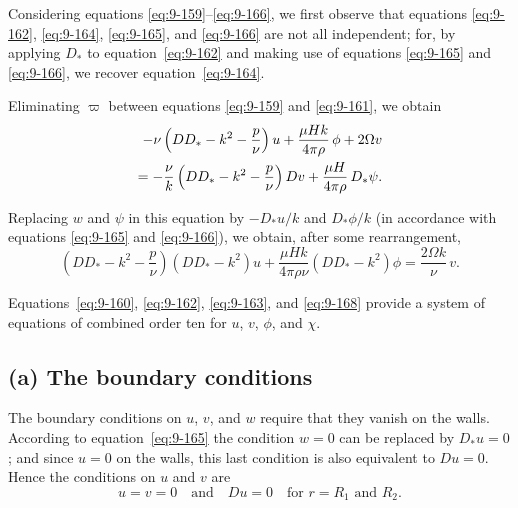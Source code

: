Considering equations \eqref{eq:9-159}--\eqref{eq:9-166}, we first observe that equations \eqref{eq:9-162}, \eqref{eq:9-164}, \eqref{eq:9-165}, and \eqref{eq:9-166} are not all independent; for, by applying $D_*$ to equation~\eqref{eq:9-162} and making use of equations \eqref{eq:9-165} and \eqref{eq:9-166}, we recover equation~\eqref{eq:9-164}.

Eliminating $\varpi$ between equations \eqref{eq:9-159} and \eqref{eq:9-161}, we obtain
\begin{align}
-\nu\left(DD_* - k^2 - \frac{p}{\nu}\right) u + \frac{\mu Hk}{4\pi\rho}\, \phi + 2\Omega v \notag \\
= -\frac{\nu}{k}\left(DD_* - k^2 - \frac{p}{\nu}\right) Dv + \frac{\mu H}{4\pi\rho}\, D_*\psi. \label{eq:9-167}
\end{align}

Replacing $w$ and $\psi$ in this equation by $-D_*u/k$ and $D_*\phi/k$ (in accordance with equations \eqref{eq:9-165} and \eqref{eq:9-166}), we obtain, after some rearrangement,
\begin{equation}
\left(DD_* - k^2 - \frac{p}{\nu}\right)(DD_* - k^2)u + \frac{\mu Hk}{4\pi\rho\nu}(DD_* - k^2)\phi = \frac{2\Omega k}{\nu}\, v. \label{eq:9-168}
\end{equation}

Equations~\eqref{eq:9-160}, \eqref{eq:9-162}, \eqref{eq:9-163}, and \eqref{eq:9-168} provide a system of equations of combined order ten for $u$, $v$, $\phi$, and $\chi$.

\subsection*{(a) The boundary conditions}

The boundary conditions on $u$, $v$, and $w$ require that they vanish on the walls. According to equation~\eqref{eq:9-165} the condition $w = 0$ can be replaced by $D_*u = 0$; and since $u = 0$ on the walls, this last condition is also equivalent to $Du = 0$. Hence the conditions on $u$ and $v$ are
\begin{equation}
u = v = 0 \quad \text{and} \quad Du = 0 \quad \text{for } r = R_1 \text{ and } R_2. \label{eq:9-169}
\end{equation}

